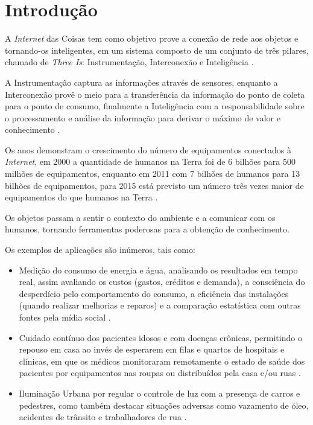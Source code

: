 %

\chapter{Introdução}

A \textit{Internet} das Coisas tem como objetivo prove a conexão de rede aos objetos e tornando-os inteligentes, em um sistema composto de um conjunto de três pilares, chamado de \textit{Three Is}: Instrumentação, Interconexão e Inteligência \cite{mqttibm2012}.

A Instrumentação captura as informações através de sensores, enquanto a 
Interconexão provê o meio para a transferência da informação do ponto de coleta para o ponto de consumo, finalmente a Inteligência com a responsabilidade sobre o processamento e análise da informação para derivar o máximo de valor e conhecimento \cite{mqttibm2012}.

Os anos demonstram o crescimento do número de equipamentos conectados à 
\textit{Internet}, em 2000 a quantidade de humanos na Terra foi de 6 bilhões para 500 milhões de equipamentos, enquanto em 2011 com 7 bilhões de humanos para 13 bilhões de equipamentos, para 2015 está previsto um número três vezes maior de equipamentos do que humanos na Terra \cite{mirkopresser2012}.

Os objetos passam a sentir o contexto do ambiente e a comunicar com os humanos, tornando ferramentas poderosas para a obtenção de conhecimento. 

Os exemplos de aplicações são inúmeros, tais como:

\begin{itemize}
    
	\item Medição do consumo de energia e água, analisando os resultados em tempo real, assim avaliando os custos (gastos, créditos e demanda), a consciência do desperdício pelo comportamento do consumo, a eficiência das instalações (quando realizar melhorias e reparos) e a comparação estatística com outras fontes pela mídia social \cite{mirkopresser2012}.
	
    \item Cuidado contínuo dos pacientes idosos e com doenças crônicas, 
    permitindo o repouso em casa ao invés de esperarem em filas e quartos de hospitais e clínicas, em que os médicos monitoraram remotamente o estado de saúde dos pacientes por equipamentos nas roupas ou distribuídos pela casa e/ou ruas \cite{mirkopresser2012}.
	
    \item Iluminação Urbana por regular o controle de luz com a presença de carros e pedestres, como também destacar situações adversas como vazamento de óleo, acidentes de trânsito e trabalhadores de rua \cite{mirkopresser2012}.
    
\end{itemize}

